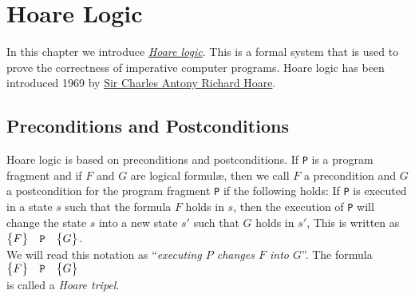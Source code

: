 \chapter{Hoare Logic}
In this chapter we introduce \href{http://en.wikipedia.org/wiki/Hoare_logic}{\emph{Hoare logic}}.
This is a formal system that is used to prove the correctness of imperative computer programs.  
Hoare logic has been introduced 1969 by  
\href{http://en.wikipedia.org/wiki/C._A._R._Hoare}{Sir Charles Antony Richard Hoare}.
 

\section{Preconditions and Postconditions}
Hoare logic is based on preconditions and postconditions.  If \texttt{P}
 is a program fragment and if $F$ and $G$ are logical formul\ae, then we call
$F$ a precondition and $G$ a postcondition for the program fragment \texttt{P}
if the following holds:  If \texttt{P} is executed in a state $s$ such that the formula $F$ holds in
$s$, then the execution of \texttt{P} will change the state $s$ into a new state $s'$ such that 
$G$ holds in $s'$,  This is written as
\\[0.2cm]
\hspace*{1.3cm}
$ \bigl\{F\bigr\}\quad\texttt{P}\quad\bigl\{G\bigr\} $.
\\[0.2cm]
We will read this notation as ``\emph{executing $P$ changes $F$ into $G$}''.
The formula
\\[0.2cm]
\hspace*{1.3cm}
$ \bigl\{F\bigr\}\quad\texttt{P}\quad\bigl\{G\bigr\} $
\\[0.2cm]
is called a \emph{Hoare tripel}.
\vspace*{0.3cm}


